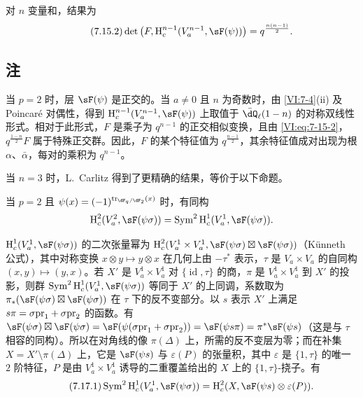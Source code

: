 对 $n$ 变量和，结果为
\begin{equation*}\tag{7.15.2}\label{VI:eq:7-15-2}
  \det\left(F,\h_c^{n-1}(V_a^{n-1},\sF(\psi))\right) = q^{\frac{n(n-1)}{2}} \text{.}
\end{equation*}

\subsection{注}\label{VI:7-16}

当 $p=2$ 时，层 $\sF(\psi)$ 是正交的。当 $a\ne 0$ 且 $n$ 为奇数时，由 \ref{VI:7-4}(ii) 及 Poincaré 对偶性，得到 $\h_c^{n-1}(V_a^{n-1},\sF(\psi))$ 上取值于 $\bar\dQ_\ell(1-n)$ 的对称双线性形式。相对于此形式，$F$ 是乘子为 $q^{n-1}$ 的正交相似变换，且由 \eqref{VI:eq:7-15-2}，$q^{\frac{1-n}{2}} F$ 属于特殊正交群。因此，$F$ 的某个特征值为 $q^{\frac{n-1}{2}}$，其余特征值成对出现为根 $\alpha$、$\bar\alpha$，每对的乘积为 $q^{n-1}$。

当 $n=3$ 时，L.\ Carlitz \cite{ca69-2} 得到了更精确的结果，等价于以下命题。

\begin{proposition_}\label{VI:7-17}
当 $p=2$ 且 $\psi(x)=(-1)^{\tr_{\dF_q/\dF_2}(x)}$ 时，有同构
\[
  \h_c^2(V_a^2,\sF(\psi\sigma)) = \operatorname{Sym}^2 \h_c^1(V_a^1,\sF(\psi\sigma)) \text{.}
\]
\end{proposition_}

$\h_c^1(V_a^1,\sF(\psi\sigma))$ 的二次张量幂为 $\h_c^2(V_a^1\times V_a^1,\sF(\psi\sigma)\boxtimes \sF(\psi\sigma))$（K\"unneth 公式），其中对称变换 $x\otimes y\mapsto y\otimes x$ 在几何上由 $-\tau^\ast$ 表示，$\tau$ 是 $V_a\times V_a$ 的自同构 $(x,y)\mapsto (y,x)$。若 $X'$ 是 $V_a^1\times V_a^1$ 对 $\{\operatorname{id}{},\tau\}$ 的商，$\pi$ 是 $V_a^1\times V_a^1$ 到 $X'$ 的投影，则群 $\operatorname{Sym}^2 \h_c^1(V_a^1,\sF(\psi\sigma))$ 等同于 $X'$ 的上同调，系数取为 $\pi_\ast(\sF(\psi\sigma)\boxtimes \sF(\psi\sigma))$ 在 $\tau$ 下的反不变部分。以 $s$ 表示 $X'$ 上满足 $s\pi =\sigma\mathrm{pr}_1+\sigma\mathrm{pr}_2$ 的函数。有 $\sF(\psi\sigma)\boxtimes \sF(\psi\sigma) = \sF(\psi(\sigma\pr_1+\sigma\pr_2)) = \sF(\psi s \pi) = \pi^\ast \sF(\psi s)$（这是与 $\tau$ 相容的同构）。所以在对角线的像 $\pi(\Delta)$ 上，所需的反不变层为零；而在补集 $X=X'\setminus \pi(\Delta)$ 上，它是 $\sF(\psi s)$ 与 $\varepsilon(P)$ 的张量积，其中 $\varepsilon$ 是 $\{1,\tau\}$ 的唯一 $2$ 阶特征，$P$ 是由 $V_a^1\times V_a^1$ 诱导的二重覆盖给出的 $X$ 上的 $\{1,\tau\}$-挠子。有
\begin{equation*}\tag{7.17.1}\label{VI:eq:7-17-1}
  \operatorname{Sym}^2 \h_c^1(V_a^1,\sF(\psi\sigma)) = \h_c^2(X,\sF(\psi s)\otimes \varepsilon(P)) \text{.}
\end{equation*}

